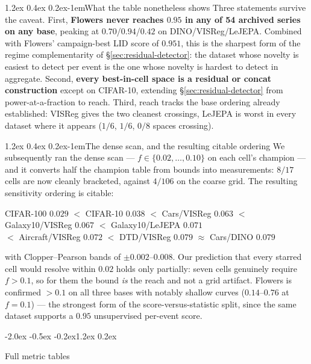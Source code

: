 \documentclass{article}
\makeatletter
\renewcommand\section{\@startsection{section}{1}{\z@}%
  {-2.0ex \@plus -0.5ex \@minus -0.2ex}{1.2ex \@plus 0.2ex}%
  {\large\bf\raggedright}}
\renewcommand\paragraph{\@startsection{paragraph}{4}{\z@}%
  {1.2ex \@plus 0.4ex \@minus 0.2ex}{-1em}{\normalsize\bf}}
\makeatother
\begin{document}
\paragraph{What the table nonetheless shows}
Three statements survive the caveat. First, \textbf{Flowers never reaches
$0.95$ in any of 54 archived series on any base}, peaking at $0.70$/$0.94$/$0.42$
on DINO/VISReg/LeJEPA. Combined with Flowers' campaign-best LID score of
$0.951$, this is the sharpest form of the regime complementarity of
\S\ref{sec:residual-detector}: the dataset whose novelty is easiest to detect
per event is the one whose novelty is hardest to detect in aggregate. Second,
\textbf{every best-in-cell space is a residual or concat construction} except on
CIFAR-10, extending \S\ref{sec:residual-detector} from power-at-a-fraction to
reach. Third, reach tracks the base ordering already established: VISReg gives
the two cleanest crossings, LeJEPA is worst in every dataset where it appears
($1/6$, $1/6$, $0/8$ spaces crossing).

\paragraph{The dense scan, and the resulting citable ordering}
We subsequently ran the dense scan --- $f\in\{0.02,\ldots,0.10\}$ on each cell's
champion --- and it converts half the champion table from bounds into
measurements: $8/17$ cells are now cleanly bracketed, against $4/106$ on the
coarse grid. The resulting sensitivity ordering is citable:
\begin{center}\small
CIFAR-100 $0.029$ $<$ CIFAR-10 $0.038$ $<$ Cars/VISReg $0.063$ $<$
Galaxy10/VISReg $0.067$ $<$ Galaxy10/LeJEPA $0.071$\\
$<$ Aircraft/VISReg $0.072$ $<$ DTD/VISReg $0.079$ $\approx$ Cars/DINO $0.079$
\end{center}
with Clopper--Pearson bands of $\pm0.002$--$0.008$. Our prediction that every
starred cell would resolve within $0.02$ holds only partially: seven cells
genuinely require $f>0.1$, so for them the bound \emph{is} the reach and not a
grid artifact. Flowers is confirmed $>0.1$ on all three bases with notably
shallow curves ($0.14$--$0.76$ at $f=0.1$) --- the strongest form of the
score-versus-statistic split, since the same dataset supports a $0.95$
unsupervised per-event score.

\section{Full metric tables}
\label{app:full}
\end{document}

